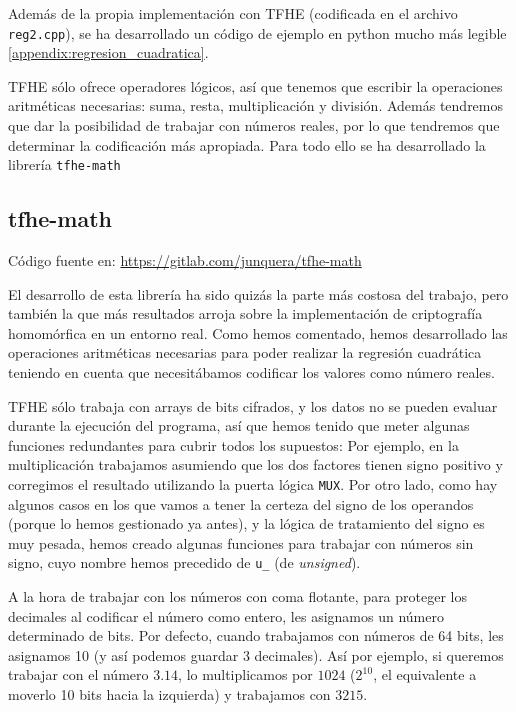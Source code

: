 Además de la propia implementación con TFHE (codificada en el archivo \verb|reg2.cpp|), se ha desarrollado un código de ejemplo en python mucho más legible \ref{appendix:regresion_cuadratica}.

TFHE sólo ofrece operadores lógicos, así que tenemos que escribir la operaciones aritméticas necesarias: suma, resta, multiplicación y división. Además tendremos que dar la posibilidad de trabajar con números reales, por lo que tendremos que determinar la codificación más apropiada. Para todo ello se ha desarrollado la librería \texttt{tfhe-math}

\subsection{tfhe-math}

Código fuente en: \url{https://gitlab.com/junquera/tfhe-math}

El desarrollo de esta librería ha sido quizás la parte más costosa del trabajo, pero también la que más resultados arroja sobre la implementación de criptografía homomórfica en un entorno real. Como hemos comentado, hemos desarrollado las operaciones aritméticas necesarias para poder realizar la regresión cuadrática teniendo en cuenta que necesitábamos codificar los valores como número reales.

TFHE sólo trabaja con arrays de bits cifrados, y los datos no se pueden evaluar durante la ejecución del programa, así que hemos tenido que meter algunas funciones redundantes para cubrir todos los supuestos: Por ejemplo, en la multiplicación trabajamos asumiendo que los dos factores tienen signo positivo y corregimos el resultado utilizando la puerta lógica \texttt{MUX}. Por otro lado, como hay algunos casos en los que vamos a tener la certeza del signo de los operandos (porque lo hemos gestionado ya antes), y la lógica de tratamiento del signo es muy pesada, hemos creado algunas funciones para trabajar con números sin signo, cuyo nombre hemos precedido de \texttt{u\_} (de \textit{unsigned}).

A la hora de trabajar con los números con coma flotante, para proteger los decimales al codificar el número como entero, les asignamos un número determinado de bits. Por defecto, cuando trabajamos con números de 64 bits, les asignamos 10 (y así podemos guardar 3 decimales). Así por ejemplo, si queremos trabajar con el número $ 3.14 $, lo multiplicamos por $ 1024 $ ($ 2^{10} $, el equivalente a moverlo 10 bits hacia la izquierda) y trabajamos con $ 3215 $.

